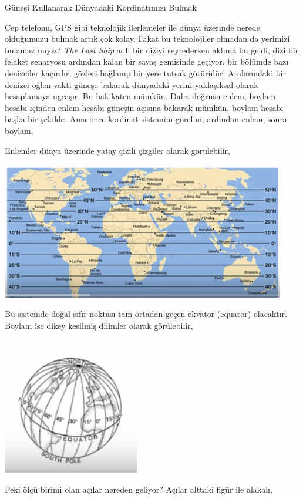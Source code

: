 \documentclass[12pt,fleqn]{article}\usepackage{../../common}
\begin{document}
Güneşi Kullanarak Dünyadaki Kordinatımızı Bulmak

Cep telefonu, GPS gibi teknolojik ilerlemeler ile dünya üzerinde nerede
olduğumuzu bulmak artık çok kolay. Fakat bu teknolojiler olmadan da yerimizi
bulamaz mıyız? {\em The Last Ship} adlı bir diziyi seyrederken aklıma bu geldi,
dizi bir felaket senaryosu ardından kalan bir savaş gemisinde geçiyor, bir
bölümde bazı denizciler kaçırılır, gözleri bağlanıp bir yere tutsak
götürülür. Aralarındaki bir denizci öğlen vakti güneşe bakarak dünyadaki yerini
yaklaşıksal olarak hesaplamaya ugraşır. Bu hakikaten mümkün. Daha doğrusu enlem,
boylam hesabı içinden enlem hesabı güneşin açısına bakarak mümkün, boylam hesabı
başka bir şekilde. Ama önce kordinat sistemini görelim, ardından enlem, sonra
boylam.

Enlemler dünya üzerinde yatay çizili çizgiler olarak görülebilir,

\includegraphics[height=6cm]{geo_04.png}

Bu sistemde doğal sıfır noktası tam ortadan geçen ekvator (equator)
olacaktır. Boylam ise dikey kesilmiş dilimler olarak görülebilir,

\includegraphics[height=6cm]{geo_02.png}

Peki ölçü birimi olan açılar nereden geliyor? Açılar alttaki figür ile alakalı,
\end{document}
